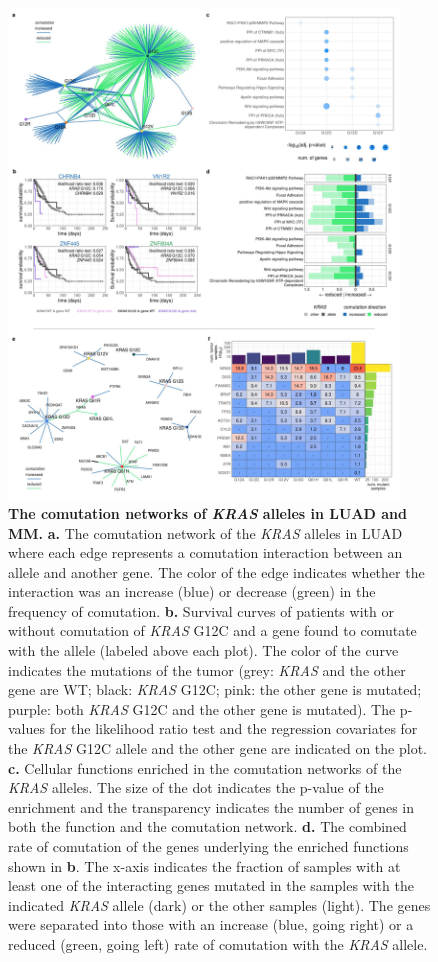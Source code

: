 \documentclass[english, 10pt, letterpaper]{article}
\newcommand{\KRAS}{\emph{KRAS}}
\begin{document}
\begin{figure}[p]
\centering
\includegraphics[height=130mm]{figures/Fig_3.jpeg}
\caption{
    \textbf{The comutation networks of \KRAS{} alleles in LUAD and MM.}
    \textbf{a.} The comutation network of the \KRAS{} alleles in LUAD where each edge represents a comutation interaction between an allele and another gene. The color of the edge indicates whether the interaction was an increase (blue) or decrease (green) in the frequency of comutation.
    \textbf{b.} Survival curves of patients with or without comutation of \KRAS{} G12C and a gene found to comutate with the allele (labeled above each plot). The color of the curve indicates the mutations of the tumor (grey: \KRAS{} and the other gene are WT; black: \KRAS{} G12C; pink: the other gene is mutated; purple: both \KRAS{} G12C and the other gene is mutated). The p-values for the likelihood ratio test and the regression covariates for the \KRAS{} G12C allele and the other gene are indicated on the plot.
    \textbf{c.} Cellular functions enriched in the comutation networks of the \KRAS{} alleles. The size of the dot indicates the p-value of the enrichment and the transparency indicates the number of genes in both the function and the comutation network.
    \textbf{d.} The combined rate of comutation of the genes underlying the enriched functions shown in \textbf{b}. The x-axis indicates the fraction of samples with at least one of the interacting genes mutated in the samples with the indicated \KRAS{} allele (dark) or the other samples (light). The genes were separated into those with an increase (blue, going right) or a reduced (green, going left) rate of comutation with the \KRAS{} allele.
}
\end{figure}
\end{document}
